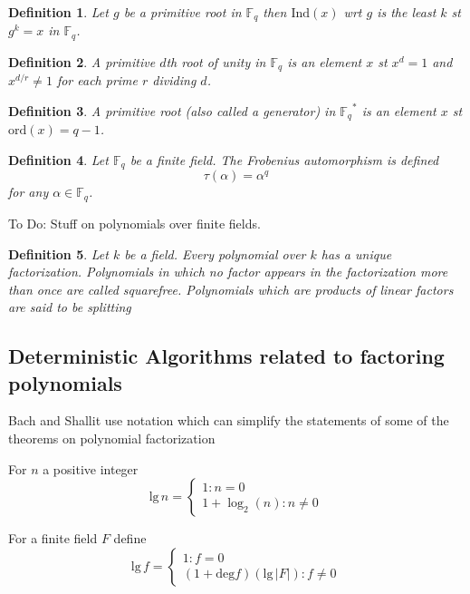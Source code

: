 \documentclass[a4paper]{article}
\newtheorem{mydef}{Definition}
\def\Fq {{ \mathbb{F} _ {q} }}
\def\ord {{ \mathrm{ord} }}
\def\lg {{ \mathrm{lg \hspace{2pt}} }}
\def\Ind {{ \mathrm{Ind} }}
\def\deg {{ \mathrm{deg}}}
\begin{document}
\begin{mydef} 
Let $g$ be a primitive root in $\Fq$ then $\Ind(x)$ wrt $g$ is the least $k$ st $g^k = x$ in $\Fq$.
\end{mydef}

\begin{mydef} 
A primitive $d$th root of unity in $\Fq$ is an element $x$ st $x^d = 1$ and $x^{d/r} \not= 1$ for each prime $r$ dividing $d$. 
\end{mydef} 

\begin{mydef} 
A primitive root (also called a generator) in $\Fq^*$ is an element $x$ st $\ord(x) = q - 1$. 
\end{mydef} 

\begin{mydef}
Let $\Fq$ be a finite field. The Frobenius automorphism is defined
$$\tau(\alpha) = \alpha^q$$
for any $\alpha \in \Fq$.
\end{mydef}

To Do: Stuff on polynomials over finite fields. \\

\begin{mydef}
Let $k$ be a field. Every polynomial over $k$ has a unique factorization. Polynomials in which no factor appears in the factorization more than once are called squarefree. Polynomials which are products of linear factors are said to be splitting 
\end{mydef}



\subsection{Deterministic Algorithms related to factoring polynomials}

\noindent Bach and Shallit use notation which can simplify the statements of some of the theorems on polynomial factorization

For $n$ a positive integer
$$
\lg n = 
\begin{cases} 
  1                   : n=0 \\
	1+\log_2(n)        : n\not= 0
\end{cases}
$$

For a finite field $F$ define
$$
\lg f = 
\begin{cases} 
  1                   : f=0 \\
	(1+\deg f)(\lg |F|) : f \not= 0
\end{cases}
$$
\end{document}
